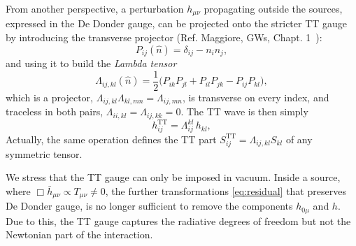 \documentclass[12pt,a4paper,oneside]{article}
\numberwithin{equation}{section}   %
\begin{document}
From another perspective,
 a perturbation $h_{\mu\nu}$ propagating outside the sources, expressed
in the De Donder gauge, can be projected onto
the stricter TT gauge by introducing
 the transverse projector  (Ref. Maggiore, GWs, Chapt. 1~\cite{Maggiore2008}):
\begin{equation}
P_{ij}(\hat n)=\delta_{ij}-n_in_j ,
\label{TTPs}
\end{equation}
and using it to build the \textit{Lambda tensor}
\begin{equation}
\Lambda_{ij,kl}(\hat n)=\frac12\bigl(P_{ik}P_{jl}+P_{il}P_{jk}-P_{ij}P_{kl}\bigr),
\label{TTP}
\end{equation}
which is a projector, $\Lambda_{ij,kl}\Lambda_{kl,mn}=\Lambda_{ij,mn}$,
is transverse on every index, and traceless in both pairs,
$\Lambda_{ii,kl}=\Lambda_{ij,kk}=0$. The TT wave is then simply
\begin{equation}
\boxed{h^{\mathrm{TT}}_{ij}=\Lambda_{ij}^{kl}\,h_{kl}} ,
\label{eq:TT-proj}
\end{equation}
Actually, the same operation defines the TT part
$S^{\mathrm{TT}}_{ij}=\Lambda_{ij,kl}S_{kl}$ of any symmetric tensor.

We stress that the TT gauge can only be imposed in vacuum. Inside a source,
where $\Box\bar h_{\mu\nu}\propto T_{\mu\nu}\neq0$, the further
transformations \eqref{eq:residual} that preserves
De Donder gauge, is no longer sufficient to remove the
components $h_{0\mu}$ and $h$. \\
Due to this, the TT gauge captures the
radiative degrees of freedom but not the Newtonian part of the interaction.
\end{document}
